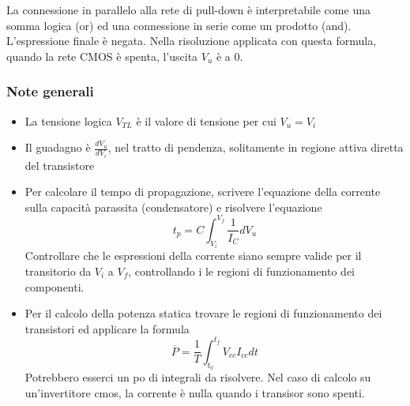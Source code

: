 \documentclass{article}
\begin{document}
La connessione in parallelo alla rete di pull-down è interpretabile come una somma logica (or) ed una connessione in serie come un prodotto (and).
L'espressione finale è negata.
Nella risoluzione applicata con questa formula, quando la rete CMOS è spenta, l'uscita $V_u$ è a 0.

\subsubsection*{Note generali}
\begin{itemize}
    \item La tensione logica $V_{TL}$ è il valore di tensione per cui $V_u = V_i$
    \item Il guadagno è $\frac{dV_u}{dV_i}$, nel tratto di pendenza, solitamente in regione attiva diretta del transistore
    \item Per calcolare il tempo di propagazione, scrivere l'equazione della corrente sulla capacità parassita (condensatore) e risolvere l'equazione
        \[
            t_p = C \int_{V_i}^{V_f} \frac{1}{I_C} dV_u
        \]
    Controllare che le espressioni della corrente siano sempre valide per il transitorio da $V_i$ a $V_f$, controllando i le regioni di funzionamento dei componenti.
\item Per il calcolo della potenza statica trovare le regioni di funzionamento dei transistori ed applicare la formula
    \[
        \overline{P} = \frac{1}{T} \int_{t_0}^{t_f} V_{cc} I_{cc} dt
    \]
    Potrebbero esserci un po di integrali da risolvere. Nel caso di calcolo su un'invertitore cmos, la corrente è nulla quando i transisor sono spenti.
\end{itemize}
\end{document}

